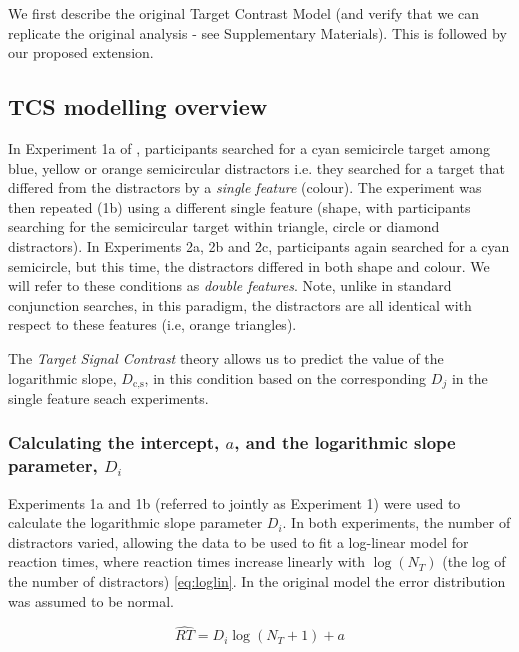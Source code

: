 \documentclass[smallextended, natbib]{svjour3}       %
\begin{document}
We first describe the original Target Contrast Model (and verify that we can replicate the original analysis - see Supplementary Materials). This is followed by our proposed extension.

\subsection{TCS modelling overview} 

In Experiment 1a of \cite{buetti2019predicting}, participants searched for a cyan semicircle target among blue, yellow or orange semicircular distractors i.e. they searched for a target that differed from the distractors by a \textit{single feature} (colour). The experiment was then repeated (1b) using a different single feature (shape, with participants searching for the semicircular target within triangle, circle or diamond distractors). In Experiments 2a, 2b and 2c, participants again searched for a cyan semicircle, but this time, the distractors differed in both shape and colour. We will refer to these conditions as \textit{double features}. Note, unlike in standard conjunction searches, in this paradigm, the distractors are all identical with respect to these features (i.e, orange triangles). 

The \textit{Target Signal Contrast} theory allows us to predict the value of the logarithmic slope, $D_\text{c,s}$, in this condition based on the  corresponding $D_j$ in the single feature seach experiments. 



\subsubsection{Calculating the intercept, $a$, and the logarithmic slope parameter, $D_i$}
\label{sec:fitting_D}

Experiments 1a and 1b (referred to jointly as Experiment 1) were used to calculate the logarithmic slope parameter $D_i$. In both experiments, the number of distractors varied, allowing the data to be used to fit a log-linear model for reaction times, where reaction times increase linearly with $\log(N_T)$ (the log of the number of distractors) \ref{eq:loglin}. In the original model the error distribution was assumed to be normal. 

\begin{equation}
\hat{RT} = D_i\log(N_T+1) + a
\label{eq:loglin}
\end{equation}
\end{document}
